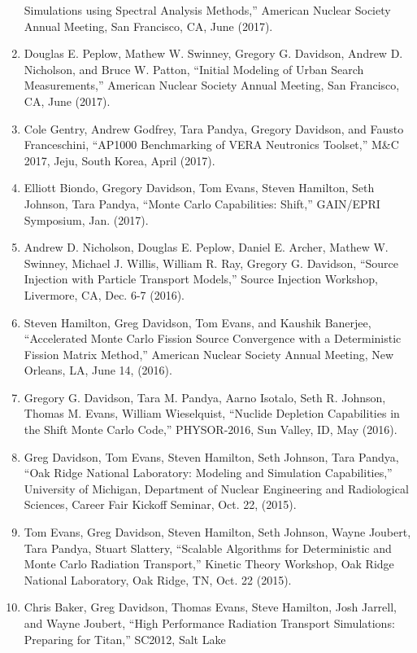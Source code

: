 \documentclass[letterpaper,11pt]{article}
\begin{document}
\begin{enumerate}
    Simulations using Spectral Analysis Methods,'' American Nuclear
    Society Annual Meeting, San Francisco, CA, June (2017).
  \item Douglas E. Peplow, Mathew W. Swinney, Gregory G. Davidson,
    Andrew D. Nicholson, and Bruce W. Patton, ``Initial Modeling of
    Urban Search Measurements,'' American Nuclear Society Annual
    Meeting, San Francisco, CA, June (2017).
  \item Cole Gentry, Andrew Godfrey, Tara Pandya, Gregory Davidson,
    and Fausto Franceschini, ``AP1000 Benchmarking of VERA Neutronics
    Toolset,'' M\&C 2017, Jeju, South Korea, April (2017).
  \item Elliott Biondo, Gregory Davidson, Tom Evans, Steven
    Hamilton, Seth Johnson, Tara Pandya, ``Monte Carlo Capabilities:
    Shift,'' GAIN/EPRI Symposium, Jan. (2017).
  \item Andrew D. Nicholson, Douglas E. Peplow, Daniel E. Archer,
    Mathew W. Swinney, Michael J. Willis, William R. Ray, Gregory
    G. Davidson, ``Source Injection with Particle Transport
    Models,'' Source Injection Workshop, Livermore, CA, Dec. 6-7
    (2016).
  \item Steven Hamilton, Greg Davidson, Tom Evans, and Kaushik
    Banerjee, ``Accelerated Monte Carlo Fission Source Convergence
    with a Deterministic Fission Matrix Method,'' American Nuclear
    Society Annual Meeting, New Orleans, LA, June 14, (2016).
  \item Gregory G. Davidson, Tara M. Pandya, Aarno Isotalo, Seth
    R. Johnson, Thomas M. Evans, William Wieselquist, ``Nuclide
    Depletion Capabilities in the Shift Monte Carlo Code,''
    PHYSOR-2016, Sun Valley, ID, May (2016).
  \item Greg Davidson, Tom Evans, Steven Hamilton, Seth Johnson,
    Tara Pandya, ``Oak Ridge National Laboratory: Modeling and
    Simulation Capabilities,'' University of Michigan, Department of
    Nuclear Engineering and Radiological Sciences, Career Fair
    Kickoff Seminar, Oct. 22, (2015).
  \item Tom Evans, Greg Davidson, Steven Hamilton, Seth Johnson,
    Wayne Joubert, Tara Pandya, Stuart Slattery, ``Scalable
    Algorithms for Deterministic and Monte Carlo Radiation
    Transport,'' Kinetic Theory Workshop, Oak Ridge National
    Laboratory, Oak Ridge, TN, Oct. 22 (2015).
  \item Chris Baker, Greg Davidson, Thomas Evans, Steve Hamilton,
    Josh Jarrell, and Wayne Joubert, ``High Performance Radiation
    Transport Simulations: Preparing for Titan,'' SC2012, Salt Lake

\end{enumerate}
\end{document}
